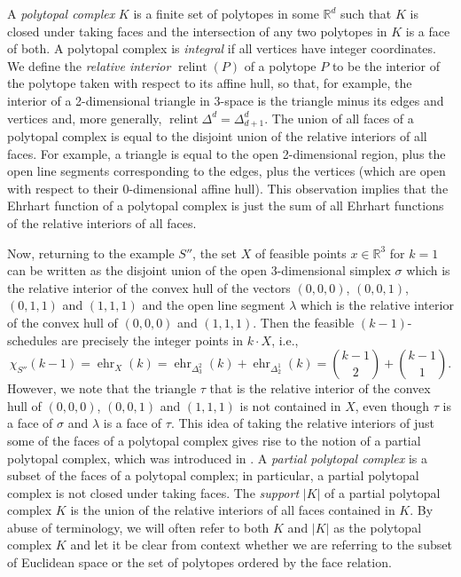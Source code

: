 \documentclass[12pt,reqno]{amsart}
\numberwithin{definition}{section}
\theoremstyle{definition}
\newcommand{\RR}{\mathbb{R}}
\newcommand{\ehr}{\operatorname{ehr}}
\newcommand{\relint}{\operatorname{relint}}
\begin{document}
A \emph{polytopal complex} $K$ is a finite set of polytopes in some $\RR^d$ such that $K$ is closed under taking faces and the intersection of any two polytopes in $K$ is a face of both. A polytopal complex is \emph{integral} if all vertices have integer coordinates. We define the \emph{relative interior} $\relint(P)$ of a polytope $P$ to be the interior of the polytope taken with respect to its affine hull, so that, for example, the interior of a 2-dimensional triangle in 3-space is the triangle minus its edges and vertices and, more generally, $\relint{\Delta^d} = \Delta^d_{d+1}$.
 The union of all faces of a polytopal complex is equal to the disjoint union of the relative interiors of all faces. For example, a triangle is equal to the open 2-dimensional region, plus the open line segments corresponding to the edges, plus the vertices (which are open with respect to their 0-dimensional affine hull). This observation implies that the Ehrhart function of a polytopal complex is just the sum of all Ehrhart functions of the relative interiors of all faces.

Now, returning to the example $S''$, the set $X$ of feasible points $x\in\RR^3$ for $k=1$ can be written as the disjoint union of the open 3-dimensional simplex $\sigma$ which is the relative interior of the convex hull of the vectors $(0,0,0)$, $(0,0,1)$, $(0,1,1)$ and $(1,1,1)$ and the open line segment $\lambda$ which is the relative interior of the convex hull of $(0,0,0)$ and $(1,1,1)$. Then the feasible $(k-1)$-schedules are precisely the integer points in $k\cdot X$, i.e., 
\[
\chi_{S''}(k-1)=\ehr_X(k) = \ehr_{\Delta^2_3}(k) + \ehr_{\Delta^1_2}(k) = \binom{k-1}{2} + \binom{k-1}{1}.
\]
However, we note that the triangle $\tau$ that is the relative interior of the convex hull of $(0,0,0)$, $(0,0,1)$ and $(1,1,1)$ is not contained in $X$, even though $\tau$ is a face of $\sigma$ and $\lambda$ is a face of $\tau$. This idea of taking the relative interiors of just some of the faces of a polytopal complex gives rise to the notion of a partial polytopal complex, which was introduced in \cite{fstar}. A \emph{partial polytopal complex} is a subset of the faces of a polytopal complex; in particular, a partial polytopal complex is not closed under taking faces. The \emph{support} $|K|$ of a partial polytopal complex $K$ is the union of the relative interiors of all faces contained in $K$. By abuse of terminology, we will often refer to both $K$ and $|K|$ as the polytopal complex $K$ and let it be clear from context whether we are referring to the subset of Euclidean space or the set of polytopes ordered by the face relation.
\end{document}
